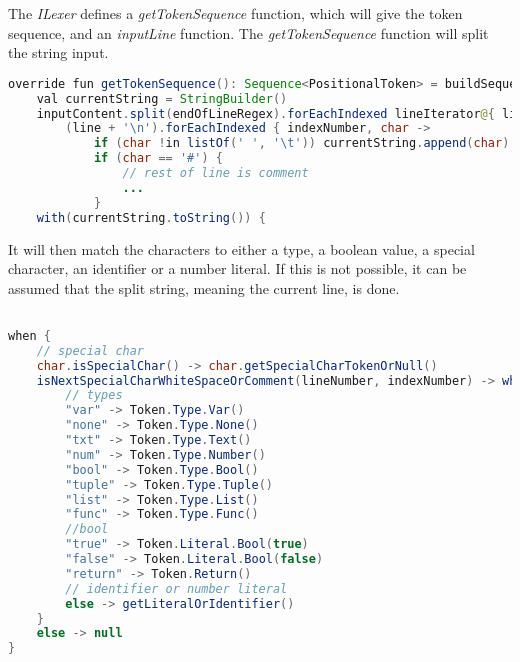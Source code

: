 The \textit{ILexer} defines a \textit{getTokenSequence} function, which will give the token sequence, and an \textit{inputLine} function.
The \textit{getTokenSequence} function will split the string input.
\begin{lstlisting}[language=java,label=lis:LexerStringSplit,caption=The string is being split and new lines are added to the string .,firstnumber=8]
override fun getTokenSequence(): Sequence<PositionalToken> = buildSequence {
	val currentString = StringBuilder()
	inputContent.split(endOfLineRegex).forEachIndexed lineIterator@{ lineNumber, line ->
		(line + '\n').forEachIndexed { indexNumber, char ->
			if (char !in listOf(' ', '\t')) currentString.append(char)
			if (char == '#') {
				// rest of line is comment
				...
			}
	with(currentString.toString()) {
\end{lstlisting}		
It will then match the characters to either a type, a boolean value, a special character, an identifier or a number literal.
If this is not possible, it can be assumed that the split string, meaning the current line, is done.
\begin{lstlisting}[language=java,label=lis:LexerStringMatcher,caption=The split string is being matched to a token,firstnumber=19]

when {
	// special char
	char.isSpecialChar() -> char.getSpecialCharTokenOrNull()
	isNextSpecialCharWhiteSpaceOrComment(lineNumber, indexNumber) -> when (this) {
		// types
		"var" -> Token.Type.Var()
		"none" -> Token.Type.None()
		"txt" -> Token.Type.Text()
		"num" -> Token.Type.Number()
		"bool" -> Token.Type.Bool()
		"tuple" -> Token.Type.Tuple()
		"list" -> Token.Type.List()
		"func" -> Token.Type.Func()
		//bool
		"true" -> Token.Literal.Bool(true)
		"false" -> Token.Literal.Bool(false)
		"return" -> Token.Return()
		// identifier or number literal
		else -> getLiteralOrIdentifier()
	}
	else -> null
}
\end{lstlisting}
